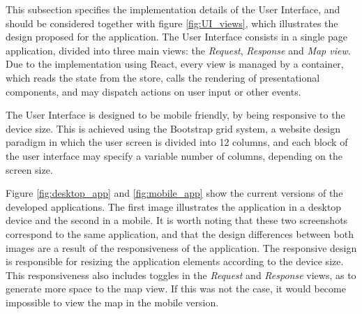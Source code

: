 This subsection specifies the implementation details of the User Interface,
and should be considered together with figure \ref{fig:UI_views},
which illustrates the design proposed for the application.
The User Interface consists in a single page application,
divided into three main views: the \textit{Request}, \textit{Response} and \textit{Map view}.
Due to the implementation using React, every view is managed by a container,
which reads the state from the store, calls the rendering of presentational components,
and may dispatch actions on user input or other events. 

The User Interface is designed to be mobile friendly, by being responsive to the 
device size. This is achieved using the Bootstrap grid system, 
a website design paradigm in which the user screen is divided into 12 columns,
and each block of the user interface may specify a variable number of columns, depending on the screen size.

Figure \ref{fig:desktop_app} and \ref{fig:mobile_app} show the current versions of the developed applications.
The first image illustrates the application in a desktop device and the second in a mobile.
It is worth noting that these two screenshots correspond to the same application,
and that the design differences between both images are a result of the responsiveness of the application.
The responsive design is responsible for resizing the application elements according to the device size.
This responsiveness also includes toggles in the \textit{Request} and \textit{Response} views, as to generate more space 
to the map view. If this was not the case, it would become impossible to view the map in the mobile version.  


